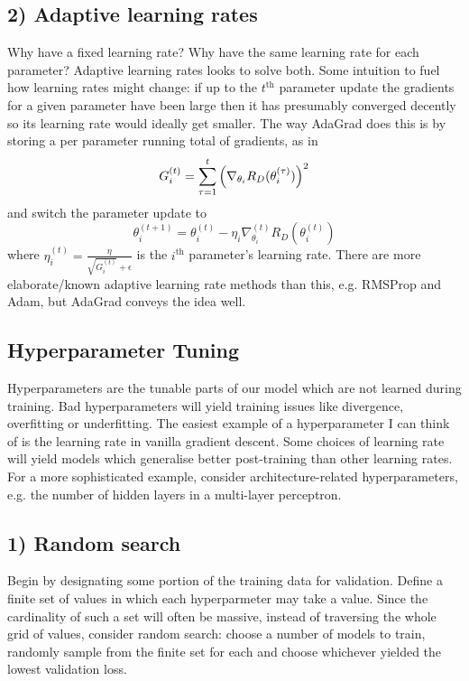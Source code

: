\documentclass[11pt]{article}
\begin{document}
\subsection*{2) Adaptive learning rates}
Why have a fixed learning rate? Why have the same learning rate for each parameter? Adaptive learning rates looks to solve both. Some intuition to fuel how learning rates might change: if up to the $t^{\text{th}}$ parameter update the gradients for a given parameter have been large then it has presumably converged decently so its learning rate would ideally get smaller. The way AdaGrad does this is by storing a per parameter running total of gradients, as in
$$
G_i^{(t)}
=
\sum_{\tau=1}^t\left(\nabla_{\theta_i}R_D(\theta_i^{(\tau)})\right)^2
$$
and switch the parameter update to
$$
\theta_i^{(t+1)}
=
\theta_i^{(t)}-\eta_i\nabla_{\theta_i}^{(t)}R_D(\theta_i^{(t)})
$$
where $\eta_i^{(t)}=\frac{\eta}{\sqrt{G_i^{(t)}}+\epsilon}$ is the $i^{\text{th}}$ parameter's learning rate. There are more elaborate/known adaptive learning rate methods than this, e.g. RMSProp and Adam, but AdaGrad conveys the idea well.

\subsection{Hyperparameter Tuning}
Hyperparameters are the tunable parts of our model which are not learned during training. Bad hyperparameters will yield training issues like divergence, overfitting or underfitting. The easiest example of a hyperparameter I can think of is the learning rate in vanilla gradient descent. Some choices of learning rate will yield models which generalise better post-training than other learning rates. For a more sophisticated example, consider architecture-related hyperparameters, e.g. the number of hidden layers in a multi-layer perceptron.

\subsection*{1) Random search}
Begin by designating some portion of the training data for validation. Define a finite set of values in which each hyperparmeter may take a value. Since the cardinality of such a set will often be massive, instead of traversing the whole grid of values, consider random search: choose a number of models to train, randomly sample from the finite set for each and choose whichever yielded the lowest validation loss.
\end{document}
